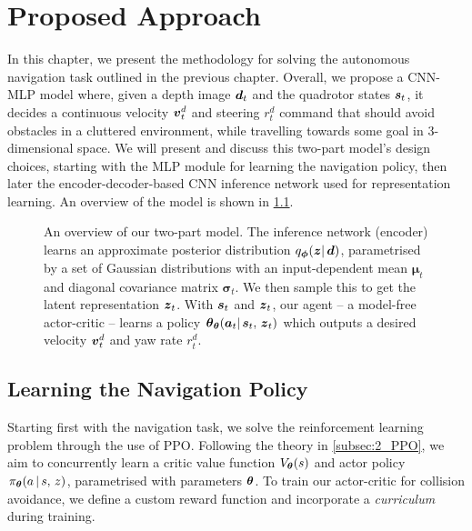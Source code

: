 \chapter{Proposed Approach}
\label{chap:5_proposed_approach}

In this chapter, we present the methodology for solving the autonomous navigation task outlined in the previous chapter. Overall, we propose a CNN-MLP model where, given a depth image ${\boldsymbol{d}}_t$ and the quadrotor states ${\boldsymbol{s}}_t$, it decides a continuous velocity ${\boldsymbol{v}}^d_t$ and steering $r^d_t$ command that should avoid obstacles in a cluttered environment, while travelling towards some goal in 3-dimensional space.
We will present and discuss this two-part model's design choices, starting with the MLP module for learning the navigation policy, then later the encoder-decoder-based CNN inference network used for representation learning. An overview of the model is shown in \cref{fig:5_overview}.
\begin{figure}[hbt]
    \centering
    \caption{An overview of our two-part model. The inference network (encoder) learns an approximate posterior distribution $q_{\boldsymbol{\phi}}(\boldsymbol{z} |\, {\boldsymbol{d}})$, parametrised by a set of Gaussian distributions with an input-dependent mean $\boldsymbol{\mu}_t$ and diagonal covariance matrix $\boldsymbol{\sigma}_t$. We then sample this to get the latent representation ${\boldsymbol{z}}_t$. With ${\boldsymbol{s}}_t$ and ${\boldsymbol{z}}_t$, our agent -- a model-free actor-critic -- learns a policy $\boldsymbol{\theta}_{\boldsymbol{\theta}}({\boldsymbol{a}}_t |\, {\boldsymbol{s}}_t, \, {\boldsymbol{z}}_t)$ which outputs a desired velocity ${\boldsymbol{v}}_t^d$ and yaw rate $r^d_t$.}
    \label{fig:5_overview}
\end{figure}

\section{Learning the Navigation Policy}
\label{sec:5_learning_navigation_policy}
Starting first with the navigation task, we solve the reinforcement learning problem through the use of PPO. Following the theory in \cref{subsec:2_PPO}, we aim to concurrently learn a critic value function $V_{\boldsymbol{\theta}}(s)$ and actor policy $\pi_{\boldsymbol{\theta}} (a \, | \, s, \, z)$, parametrised with parameters $\boldsymbol{\theta}$. To train our actor-critic for collision avoidance, we define a custom reward function and incorporate a \textit{curriculum} \cite{LearningWalkMassivelyParallel} during training.

